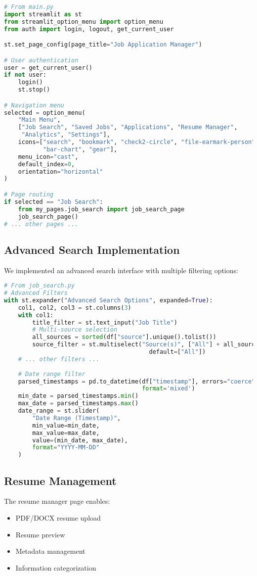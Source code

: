 \documentclass[12pt,a4paper]{report}
\begin{document}
\begin{lstlisting}[language=Python, caption=Main Streamlit Application]
# From main.py
import streamlit as st
from streamlit_option_menu import option_menu
from auth import login, logout, get_current_user

st.set_page_config(page_title="Job Application Manager")

# User authentication
user = get_current_user()
if not user:
    login()
    st.stop()

# Navigation menu
selected = option_menu(
    "Main Menu",
    ["Job Search", "Saved Jobs", "Applications", "Resume Manager", 
     "Analytics", "Settings"],
    icons=["search", "bookmark", "check2-circle", "file-earmark-person", 
           "bar-chart", "gear"],
    menu_icon="cast",
    default_index=0,
    orientation="horizontal"
)

# Page routing
if selected == "Job Search":
    from my_pages.job_search import job_search_page
    job_search_page()
# ... other pages ...
\end{lstlisting}

\subsection{Advanced Search Implementation}
We implemented an advanced search interface with multiple filtering options:

\begin{lstlisting}[language=Python, caption=Advanced Search Implementation]
# From job_search.py
# Advanced Filters
with st.expander("Advanced Search Options", expanded=True):
    col1, col2, col3 = st.columns(3)
    with col1:
        title_filter = st.text_input("Job Title")
        # Multi-source selection
        all_sources = sorted(df["source"].unique().tolist())
        source_filter = st.multiselect("Source(s)", ["All"] + all_sources, 
                                         default=["All"])
    # ... other filters ...
    
    # Date range filter
    parsed_timestamps = pd.to_datetime(df["timestamp"], errors="coerce", 
                                       format='mixed')
    min_date = parsed_timestamps.min()
    max_date = parsed_timestamps.max()
    date_range = st.slider(
        "Date Range (Timestamp)",
        min_value=min_date,
        max_value=max_date,
        value=(min_date, max_date),
        format="YYYY-MM-DD"
    )
\end{lstlisting}

\subsection{Resume Management}
The resume manager page enables:
\begin{itemize}
    \item PDF/DOCX resume upload
    \item Resume preview
    \item Metadata management
    \item Information categorization
\end{itemize}
\end{document}
